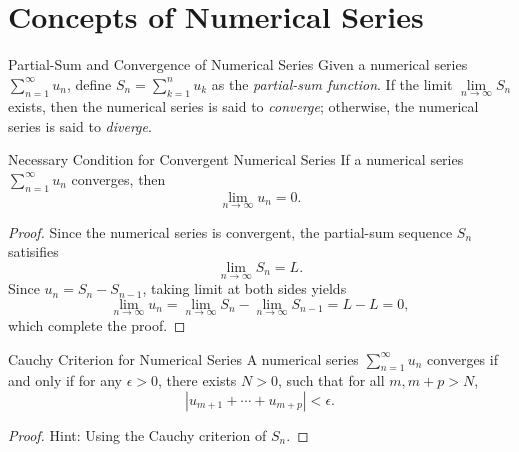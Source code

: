 
\section{Concepts of Numerical Series}

\begin{definition}{Partial-Sum and Convergence of Numerical Series}{}
  Given a numerical series $\sum\limits_{n = 1}^{\infty}u_n$,
  define $S_n = \sum\limits_{k = 1}^n u_k$ as the \emph{partial-sum function}.
  If the limit $\lim \limits _{n \rightarrow \infty} S_n$ exists,
  then the numerical series is said to \emph{converge};
  otherwise, the numerical series is said to \emph{diverge}.
\end{definition}

\begin{proposition}{Necessary Condition for Convergent Numerical Series}{}
  If a numerical series $\sum\limits_{n = 1}^{\infty}u_n$ converges,
  then
  \begin{equation}
    \lim \limits _{n \rightarrow \infty} u_n = 0.
  \end{equation}
\end{proposition}

\begin{proof}
  Since the numerical series is convergent, the partial-sum sequence $S_n$ satisifies
  \begin{equation}
    \lim \limits _{n \rightarrow \infty} S_n = L.
  \end{equation}
  Since $u_n = S_n - S_{n-1}$, taking limit at both sides yields
  \begin{equation}
    \lim \limits _{n \rightarrow \infty} u_n = \lim \limits _{n \rightarrow \infty} S_n - \lim \limits _{n \rightarrow \infty} S_{n-1}
    = L - L = 0,
  \end{equation}
  which complete the proof.
\end{proof}

\begin{proposition}{Cauchy Criterion for Numerical Series}{}
  A numerical series $\sum\limits_{n = 1}^{\infty} u_n$ converges if and only if
  for any $\epsilon > 0$, there exists $N > 0$, such that for all $m, m+p > N$,
  \begin{equation}
    |u_{m+1} + \cdots + u_{m+p}| < \epsilon.
  \end{equation}
\end{proposition}

\begin{proof}
  Hint: Using the Cauchy criterion of $S_n$.
\end{proof}

